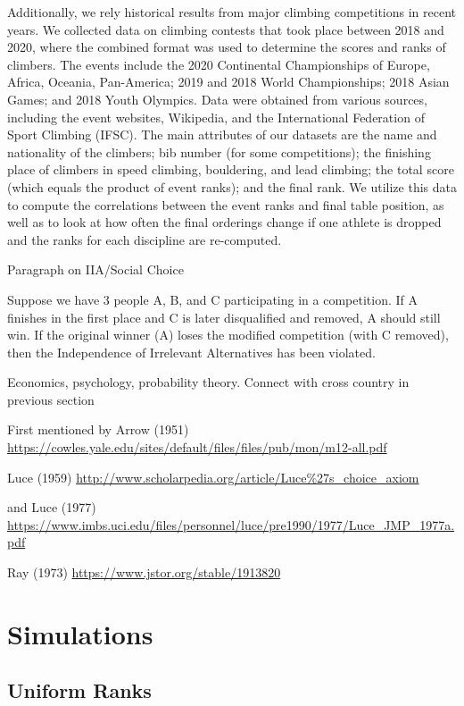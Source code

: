 \documentclass[12pt]{article}
\begin{document}
Additionally, we rely historical results from major climbing
competitions in recent years. We collected data on climbing contests
that took place between 2018 and 2020, where the combined format was
used to determine the scores and ranks of climbers. The events include
the 2020 Continental Championships of Europe, Africa, Oceania,
Pan-America; 2019 and 2018 World Championships; 2018 Asian Games; and
2018 Youth Olympics. Data were obtained from various sources, including
the event websites, Wikipedia, and the International Federation of Sport
Climbing (IFSC). The main attributes of our datasets are the name and
nationality of the climbers; bib number (for some competitions); the
finishing place of climbers in speed climbing, bouldering, and lead
climbing; the total score (which equals the product of event ranks); and
the final rank. We utilize this data to compute the correlations between
the event ranks and final table position, as well as to look at how
often the final orderings change if one athlete is dropped and the ranks
for each discipline are re-computed.

Paragraph on IIA/Social Choice

Suppose we have 3 people A, B, and C participating in a competition. If
A finishes in the first place and C is later disqualified and removed, A
should still win. If the original winner (A) loses the modified
competition (with C removed), then the Independence of Irrelevant
Alternatives has been violated.

Economics, psychology, probability theory. Connect with cross country in
previous section

First mentioned by Arrow (1951)
\url{https://cowles.yale.edu/sites/default/files/files/pub/mon/m12-all.pdf}

Luce (1959)
\url{http://www.scholarpedia.org/article/Luce\%27s_choice_axiom}

and Luce (1977)
\url{https://www.imbs.uci.edu/files/personnel/luce/pre1990/1977/Luce_JMP_1977a.pdf}

Ray (1973) \url{https://www.jstor.org/stable/1913820}

\hypertarget{simulations}{%
\section{Simulations}\label{simulations}}

\hypertarget{uniform-ranks}{%
\subsection{Uniform Ranks}\label{uniform-ranks}}
\end{document}
